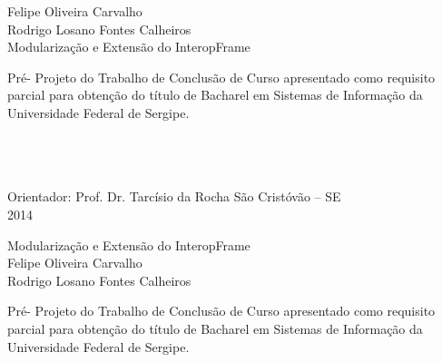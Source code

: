 \begin{titlepage}

\newpage
\thispagestyle{empty}
    \begin{center}
        {\Large Felipe Oliveira Carvalho \\ Rodrigo Losano Fontes Calheiros }\\[8.3cm]
        {\LARGE Modulariza\c{c}\~ao e Extens\~ao do InteropFrame} \\[4.3cm]
        \hspace{.45\textwidth} %
        \begin{minipage}{.5\textwidth}
            \singlespacing
                Pr\'e- Projeto do Trabalho de Conclus\~ao de Curso apresentado como requisito parcial para obten\c c\~ao do t\'itulo de Bacharel em Sistemas de Informa\c{c}\~ao da Universidade Federal de Sergipe. \\ \\ \\ \\
                
            \onehalfspacing
        \end{minipage}
				{\large Orientador: Prof. Dr. Tarc\'isio da Rocha}
        \vfill
        {\large S\~ao Crist\'ov\~ao -- SE} \\
        {\large 2014}
    \end{center}
\pagebreak

\newpage
\thispagestyle{empty}
    \begin{center}
        {\LARGE Modulariza\c{c}\~ao e Extens\~ao do InteropFrame}\\[2.3cm]
        {\Large Felipe Oliveira Carvalho \\ Rodrigo Losano Fontes Calheiros} \\[1.5cm]
        \hspace{.45\textwidth} %
        \begin{minipage}{.5\textwidth}
            \singlespacing
                Pr\'e- Projeto do Trabalho de Conclus\~ao de Curso apresentado como requisito parcial para obten\c c\~ao do t\'itulo de Bacharel em Sistemas de Informa\c{c}\~ao da Universidade Federal de Sergipe. \\


\end{minipage}
\end{center}
\end{titlepage}
